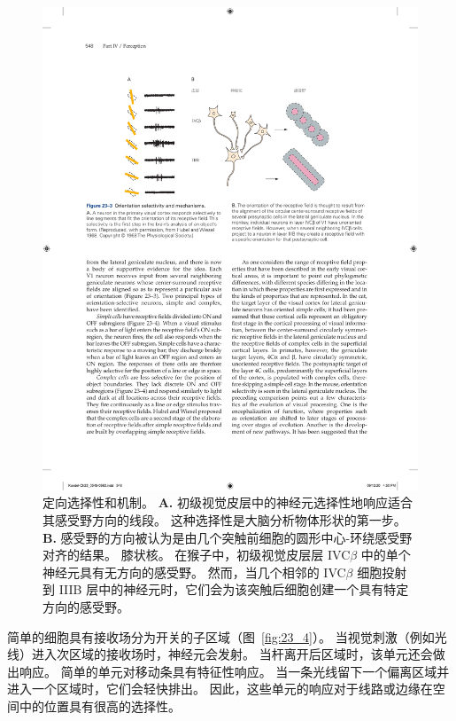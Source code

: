 \begin{figure}[htbp]
	\centering
	\includegraphics[width=0.95\linewidth]{chap23/fig_23_3}
	\caption{定向选择性和机制。
		\textbf{A.} 初级视觉皮层中的神经元选择性地响应适合其感受野方向的线段。
		这种选择性是大脑分析物体形状的第一步\cite{hubel1968receptive}。
		\textbf{B.} 感受野的方向被认为是由几个突触前细胞的圆形中心-环绕感受野对齐的结果。 
		膝状核。
		在猴子中，初级视觉皮层层 IVC$\beta$ 中的单个神经元具有无方向的感受野。
		然而，当几个相邻的 IVC$\beta$ 细胞投射到 IIIB 层中的神经元时，它们会为该突触后细胞创建一个具有特定方向的感受野。}
	\label{fig:23_3}
\end{figure}


简单的细胞具有接收场分为开关的子区域（图~\ref{fig:23_4}）。
当视觉刺激（例如光线）进入次区域的接收场时，神经元会发射。
当杆离开后区域时，该单元还会做出响应。
简单的单元对移动条具有特征性响应。
当一条光线留下一个偏离区域并进入一个区域时，它们会轻快排出。
因此，这些单元的响应对于线路或边缘在空间中的位置具有很高的选择性。


